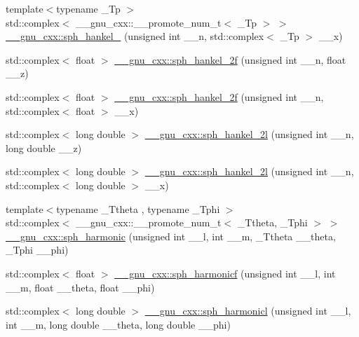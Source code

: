 \begin{DoxyCompactItemize}
\item 
{\footnotesize template$<$typename \+\_\+\+Tp $>$ }\\std\+::complex$<$ \+\_\+\+\_\+gnu\+\_\+cxx\+::\+\_\+\+\_\+promote\+\_\+num\+\_\+t$<$ \+\_\+\+Tp $>$ $>$ \hyperlink{group__gnu__math__spec__func_ga54a1b7896a7218bfe0fb7f422af62122}{\+\_\+\+\_\+gnu\+\_\+cxx\+::sph\+\_\+hankel\+\_} (unsigned int \+\_\+\+\_\+n, std\+::complex$<$ \+\_\+\+Tp $>$ \+\_\+\+\_\+x)
\item 
std\+::complex$<$ float $>$ \hyperlink{group__gnu__math__spec__func_ga9496b81f94b8ba0162cf45df72be1e71}{\+\_\+\+\_\+gnu\+\_\+cxx\+::sph\+\_\+hankel\+\_\+2f} (unsigned int \+\_\+\+\_\+n, float \+\_\+\+\_\+z)
\item 
std\+::complex$<$ float $>$ \hyperlink{group__gnu__math__spec__func_ga4c3194b71831b265811f987cbbf6e031}{\+\_\+\+\_\+gnu\+\_\+cxx\+::sph\+\_\+hankel\+\_\+2f} (unsigned int \+\_\+\+\_\+n, std\+::complex$<$ float $>$ \+\_\+\+\_\+x)
\item 
std\+::complex$<$ long double $>$ \hyperlink{group__gnu__math__spec__func_ga6d3ead73a4f0bfeeb0aa1fd99daaf3b1}{\+\_\+\+\_\+gnu\+\_\+cxx\+::sph\+\_\+hankel\+\_\+2l} (unsigned int \+\_\+\+\_\+n, long double \+\_\+\+\_\+z)
\item 
std\+::complex$<$ long double $>$ \hyperlink{group__gnu__math__spec__func_ga3d9d9aaceba455a5ddc79d178ee1cb6d}{\+\_\+\+\_\+gnu\+\_\+cxx\+::sph\+\_\+hankel\+\_\+2l} (unsigned int \+\_\+\+\_\+n, std\+::complex$<$ long double $>$ \+\_\+\+\_\+x)
\item 
{\footnotesize template$<$typename \+\_\+\+Ttheta , typename \+\_\+\+Tphi $>$ }\\std\+::complex$<$ \+\_\+\+\_\+gnu\+\_\+cxx\+::\+\_\+\+\_\+promote\+\_\+num\+\_\+t$<$ \+\_\+\+Ttheta, \+\_\+\+Tphi $>$ $>$ \hyperlink{group__gnu__math__spec__func_ga28f1390a0366bc8c9780918d9720146b}{\+\_\+\+\_\+gnu\+\_\+cxx\+::sph\+\_\+harmonic} (unsigned int \+\_\+\+\_\+l, int \+\_\+\+\_\+m, \+\_\+\+Ttheta \+\_\+\+\_\+theta, \+\_\+\+Tphi \+\_\+\+\_\+phi)
\item 
std\+::complex$<$ float $>$ \hyperlink{group__gnu__math__spec__func_ga062b1156f5646fe42719439bb3dcc9e5}{\+\_\+\+\_\+gnu\+\_\+cxx\+::sph\+\_\+harmonicf} (unsigned int \+\_\+\+\_\+l, int \+\_\+\+\_\+m, float \+\_\+\+\_\+theta, float \+\_\+\+\_\+phi)
\item 
std\+::complex$<$ long double $>$ \hyperlink{group__gnu__math__spec__func_ga414c8374b4579aa14e38f5401304b6fa}{\+\_\+\+\_\+gnu\+\_\+cxx\+::sph\+\_\+harmonicl} (unsigned int \+\_\+\+\_\+l, int \+\_\+\+\_\+m, long double \+\_\+\+\_\+theta, long double \+\_\+\+\_\+phi)

\end{DoxyCompactItemize}
